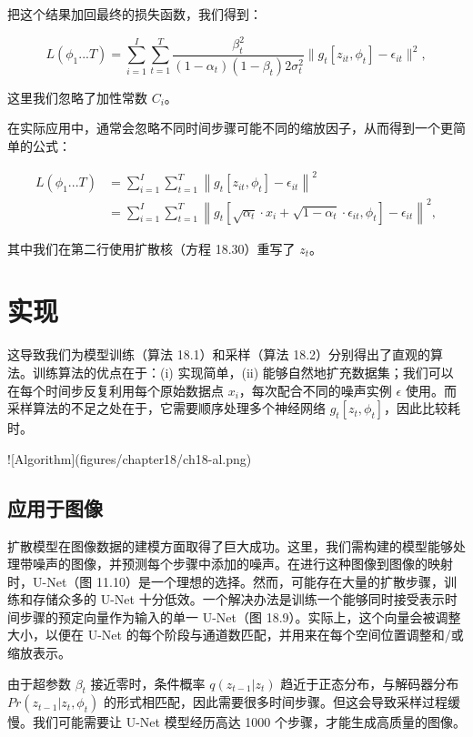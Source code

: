把这个结果加回最终的损失函数，我们得到：

\begin{equation}
L(\phi_1...T) = \sum_{i=1}^{I} \sum_{t=1}^{T} \frac{\beta_t^2}{(1 - \alpha_t)(1 - \beta_t)2\sigma_t^2} \| g_t[z_{it}, \phi_t] - \epsilon_{it} \|^2, 
\end{equation}

这里我们忽略了加性常数 \(C_i\)。

在实际应用中，通常会忽略不同时间步骤可能不同的缩放因子，从而得到一个更简单的公式：


\begin{align}
L(\phi_1...T) &= \sum_{i=1}^{I} \sum_{t=1}^{T} \left\| g_t[z_{it}, \phi_t] - \epsilon_{it} \right\|^2 \\
&= \sum_{i=1}^{I} \sum_{t=1}^{T} \left\| g_t \left[ \sqrt{\alpha_t} \cdot x_i + \sqrt{1 - \alpha_t} \cdot \epsilon_{it}, \phi_t \right] - \epsilon_{it} \right\|^2,  
\end{align} 

其中我们在第二行使用扩散核（方程 18.30）重写了 \(z_t\)。

\section{实现}
这导致我们为模型训练（算法 18.1）和采样（算法 18.2）分别得出了直观的算法。训练算法的优点在于：(i) 实现简单，(ii) 能够自然地扩充数据集；我们可以在每个时间步反复利用每个原始数据点 \(x_i\)，每次配合不同的噪声实例 \(\epsilon\) 使用。而采样算法的不足之处在于，它需要顺序处理多个神经网络 \(g_t[z_t,\phi_t]\)，因此比较耗时。


![Algorithm](figures/chapter18/ch18-al.png)

\subsection{应用于图像}
扩散模型在图像数据的建模方面取得了巨大成功。这里，我们需构建的模型能够处理带噪声的图像，并预测每个步骤中添加的噪声。在进行这种图像到图像的映射时，U-Net（图 11.10）是一个理想的选择。然而，可能存在大量的扩散步骤，训练和存储众多的 U-Net 十分低效。一个解决办法是训练一个能够同时接受表示时间步骤的预定向量作为输入的单一 U-Net（图 18.9）。实际上，这个向量会被调整大小，以便在 U-Net 的每个阶段与通道数匹配，并用来在每个空间位置调整和/或缩放表示。

由于超参数 \(\beta_t\) 接近零时，条件概率 \(q(z_{t-1}|z_t)\) 趋近于正态分布，与解码器分布 \(Pr(z_{t-1}|z_t, \phi_t)\) 的形式相匹配，因此需要很多时间步骤。但这会导致采样过程缓慢。我们可能需要让 U-Net 模型经历高达 1000 个步骤，才能生成高质量的图像。

